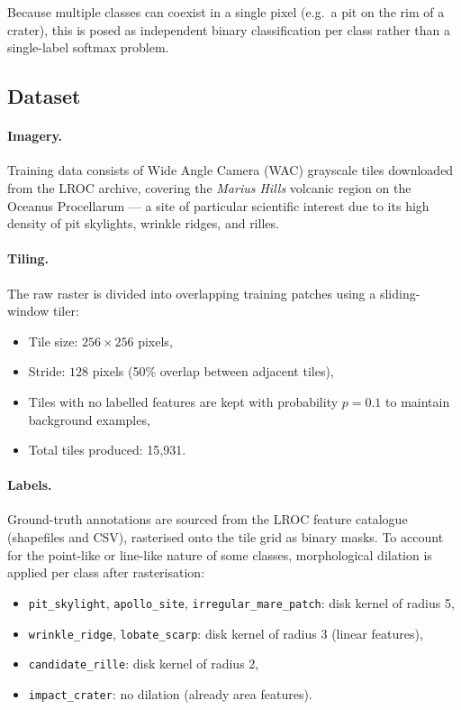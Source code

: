 \noindent
Because multiple classes can coexist in a single pixel (e.g.\ a pit on the rim of a crater), this is posed as independent binary classification per class rather than a single-label softmax problem.

\subsection{Dataset}
\label{sec:mr_dataset}

\paragraph{Imagery.}
Training data consists of Wide Angle Camera (WAC) grayscale tiles downloaded from the LROC archive, covering the \textit{Marius Hills} volcanic region on the Oceanus Procellarum — a site of particular scientific interest due to its high density of pit skylights, wrinkle ridges, and rilles.

\paragraph{Tiling.}
The raw raster is divided into overlapping training patches using a sliding-window tiler:
\begin{itemize}
    \item Tile size: $256 \times 256$ pixels,
    \item Stride: $128$ pixels (50\% overlap between adjacent tiles),
    \item Tiles with no labelled features are kept with probability $p=0.1$ to maintain background examples,
    \item Total tiles produced: 15{,}931.
\end{itemize}

\paragraph{Labels.}
Ground-truth annotations are sourced from the LROC feature catalogue (shapefiles and CSV), rasterised onto the tile grid as binary masks. To account for the point-like or line-like nature of some classes, morphological dilation is applied per class after rasterisation:
\begin{itemize}
    \item \texttt{pit\_skylight}, \texttt{apollo\_site}, \texttt{irregular\_mare\_patch}: disk kernel of radius 5,
    \item \texttt{wrinkle\_ridge}, \texttt{lobate\_scarp}: disk kernel of radius 3 (linear features),
    \item \texttt{candidate\_rille}: disk kernel of radius 2,
    \item \texttt{impact\_crater}: no dilation (already area features).
\end{itemize}

